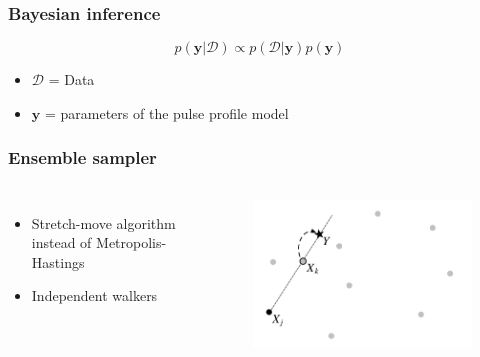 \documentclass{beamer}
\def\be{\begin{equation}}
\def\ee{\end{equation}}
\begin{document}






\begin{frame}
\frametitle{Bayesian inference}

\be \label{eq:bayes}
p(\textbf{y}|\mathcal{D}) \propto p(\mathcal{D}|\textbf{y})p(\textbf{y})
\ee
\begin{itemize}
\item $\mathcal{D}$ = Data
\item $\textbf{y}$ = parameters of the pulse profile model

\end{itemize}
\end{frame}





\begin{frame}
\frametitle{Ensemble sampler}
\begin{columns}[t] %
\begin{itemize}

\item Stretch-move algorithm instead of Metropolis-Hastings 
\item Independent walkers

\end{itemize}
\begin{figure}
\includegraphics[width=0.8\linewidth]{stretchmove.png}
\end{figure}
\end{columns}
\end{frame}
\end{document}
